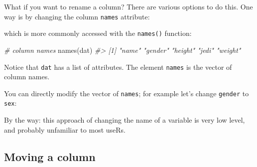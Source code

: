 \documentclass[
]{book}
\newenvironment{Shaded}{\begin{snugshade}}{\end{snugshade}}
\newcommand{\CommentTok}[1]{\textcolor[rgb]{0.56,0.35,0.01}{\textit{#1}}}
\newcommand{\DecValTok}[1]{\textcolor[rgb]{0.00,0.00,0.81}{#1}}
\newcommand{\FunctionTok}[1]{\textcolor[rgb]{0.00,0.00,0.00}{#1}}
\newcommand{\NormalTok}[1]{#1}
\newcommand{\OtherTok}[1]{\textcolor[rgb]{0.56,0.35,0.01}{#1}}
\newcommand{\SpecialCharTok}[1]{\textcolor[rgb]{0.00,0.00,0.00}{#1}}
\newcommand{\StringTok}[1]{\textcolor[rgb]{0.31,0.60,0.02}{#1}}
\begin{document}
What if you want to rename a column? There are various options to do this.
One way is by changing the column \texttt{names} attribute:

\begin{Shaded}
\end{Shaded}

which is more commonly accessed with the \texttt{names()} function:

\begin{Shaded}
\begin{Highlighting}[]
\CommentTok{\# column names}
\FunctionTok{names}\NormalTok{(dat)}
\CommentTok{\#\textgreater{} [1] "name"   "gender" "height" "jedi"   "weight"}
\end{Highlighting}
\end{Shaded}

Notice that \texttt{dat} has a list of attributes. The element \texttt{names} is the vector
of column names.

You can directly modify the vector of \texttt{names}; for example let's change
\texttt{gender} to \texttt{sex}:

\begin{Shaded}
\end{Shaded}

By the way: this approach of changing the name of a variable is very low level,
and probably unfamiliar to most useRs.

\hypertarget{moving-a-column}{%
\subsection{Moving a column}\label{moving-a-column}}
\end{document}
